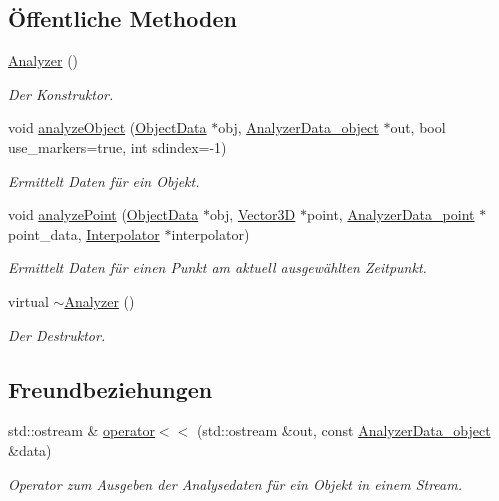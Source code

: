 \subsection*{Öffentliche Methoden}
\begin{DoxyCompactItemize}
\item 
\hyperlink{classAnalyzer_a1be2ff17bba265bdef6e1b44748eaf96}{Analyzer} ()
\begin{DoxyCompactList}\small\item\em Der Konstruktor. \end{DoxyCompactList}\item 
void \hyperlink{classAnalyzer_a2a7b5f169f664ccd9f206e508cba78ef}{analyze\-Object} (\hyperlink{classObjectData}{Object\-Data} $\ast$obj, \hyperlink{structAnalyzer_1_1AnalyzerData__object}{Analyzer\-Data\-\_\-object} $\ast$out, bool use\-\_\-markers=true, int sdindex=-\/1)
\begin{DoxyCompactList}\small\item\em Ermittelt Daten für ein Objekt. \end{DoxyCompactList}\item 
void \hyperlink{classAnalyzer_a8f73ee0aa71ae395a74b43dc76b35458}{analyze\-Point} (\hyperlink{classObjectData}{Object\-Data} $\ast$obj, \hyperlink{classVector3D}{Vector3\-D} $\ast$point, \hyperlink{structAnalyzer_1_1AnalyzerData__point}{Analyzer\-Data\-\_\-point} $\ast$point\-\_\-data, \hyperlink{classInterpolator}{Interpolator} $\ast$interpolator)
\begin{DoxyCompactList}\small\item\em Ermittelt Daten für einen Punkt am aktuell ausgewählten Zeitpunkt. \end{DoxyCompactList}\item 
virtual \hyperlink{classAnalyzer_afa899ac3a6aabbe59f791f69368ad740}{$\sim$\-Analyzer} ()
\begin{DoxyCompactList}\small\item\em Der Destruktor. \end{DoxyCompactList}\end{DoxyCompactItemize}
\subsection*{Freundbeziehungen}
\begin{DoxyCompactItemize}
\item 
std\-::ostream \& \hyperlink{classAnalyzer_a031acd0d5f2a8c997c18645dd548dca7}{operator$<$$<$} (std\-::ostream \&out, const \hyperlink{structAnalyzer_1_1AnalyzerData__object}{Analyzer\-Data\-\_\-object} \&data)
\begin{DoxyCompactList}\small\item\em Operator zum Ausgeben der Analysedaten für ein Objekt in einem Stream. \end{DoxyCompactList}\end{DoxyCompactItemize}


